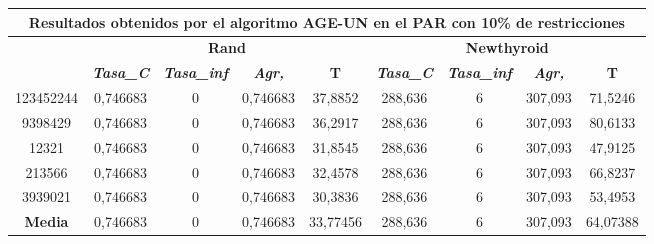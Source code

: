 \documentclass[12pt, spanish]{article}
\begin{document}
\begin{table}[H]
\footnotesize
\begin{tabular}{|c|c|c|c|c|c|c|c|c|}
\hline
\multicolumn{9}{|c|}{\textbf{Resultados obtenidos por el algoritmo AGE-UN en el PAR con 10\% de restricciones}}                                                                                                   \\ \hline
\multirow{2}{*}{} & \multicolumn{4}{c|}{\textbf{Rand}}                                                            & \multicolumn{4}{c|}{\textbf{Newthyroid}}                                                      \\ \cline{2-9} 
                  & \textit{\textbf{Tasa\_C}} & \textit{\textbf{Tasa\_inf}} & \textit{\textbf{Agr,}} & \textbf{T} & \textit{\textbf{Tasa\_C}} & \textit{\textbf{Tasa\_inf}} & \textit{\textbf{Agr,}} & \textbf{T} \\ \hline
123452244         & 0,746683                  & 0                           & 0,746683               & 37,8852    & 288,636                   & 6                           & 307,093                & 71,5246    \\ \hline
9398429           & 0,746683                  & 0                           & 0,746683               & 36,2917    & 288,636                   & 6                           & 307,093                & 80,6133    \\ \hline
12321             & 0,746683                  & 0                           & 0,746683               & 31,8545    & 288,636                   & 6                           & 307,093                & 47,9125    \\ \hline
213566            & 0,746683                  & 0                           & 0,746683               & 32,4578    & 288,636                   & 6                           & 307,093                & 66,8237    \\ \hline
3939021           & 0,746683                  & 0                           & 0,746683               & 30,3836    & 288,636                   & 6                           & 307,093                & 53,4953    \\ \hline
\textbf{Media}    & 0,746683                  & 0                           & 0,746683               & 33,77456   & 288,636                   & 6                           & 307,093                & 64,07388   \\ \hline
\end{tabular}
\end{table}
\end{document}
